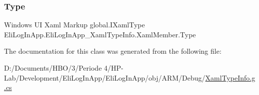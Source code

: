 \mbox{\label{class_eli_log_in_app_1_1_eli_log_in_app___xaml_type_info_1_1_xaml_member_a26483e8b7bc974da19930fbb3cfc4a23}} 
\subsubsection{\texorpdfstring{Type}{Type}}
{\footnotesize\ttfamily Windows UI Xaml Markup global.\+I\+Xaml\+Type Eli\+Log\+In\+App.\+Eli\+Log\+In\+App\+\_\+\+Xaml\+Type\+Info.\+Xaml\+Member.\+Type\hspace{0.3cm}{\ttfamily [get]}}



The documentation for this class was generated from the following file\+:\begin{DoxyCompactItemize}
\item 
D\+:/\+Documents/\+H\+B\+O/3/\+Periode 4/\+H\+P-\/\+Lab/\+Development/\+Eli\+Log\+In\+App/\+Eli\+Log\+In\+App/obj/\+A\+R\+M/\+Debug/\hyperlink{_eli_log_in_app_2_eli_log_in_app_2obj_2_a_r_m_2_debug_2_xaml_type_info_8g_8cs}{Xaml\+Type\+Info.\+g.\+cs}\end{DoxyCompactItemize}
